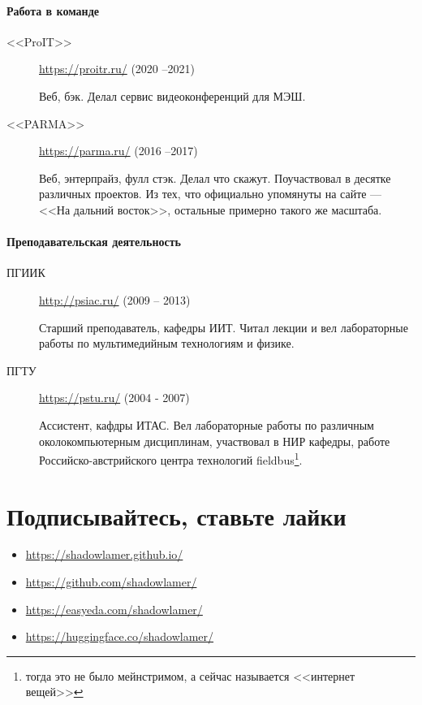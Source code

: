 \documentclass [a4paper,10pt]{article}
\begin{document}
\paragraph{Работа в команде}
\begin{description}
\item[<<ProIT>>] \url{https://proitr.ru/} (2020 --2021)

Веб, бэк. Делал сервис видеоконференций для МЭШ.

\item[<<PARMA>>] \url{https://parma.ru/} (2016 --2017)

Веб, энтерпрайз, фулл стэк. Делал что скажут. Поучаствовал в десятке различных проектов.
Из тех, что официально упомянуты на сайте --- <<На дальний восток>>, остальные примерно такого же масштаба.
\end{description}

\paragraph{Преподавательская деятельность}
\begin{description}
\item[ПГИИК] \url{http://psiac.ru/} (2009 -- 2013)

Старший преподаватель, кафедры ИИТ. Читал лекции и вел лабораторные работы по мультимедийным технологиям и физике.

\item[ПГТУ] \url{https://pstu.ru/} (2004 - 2007)

Ассистент, кафдры ИТАС. Вел лабораторные работы по различным околокомпьютерным дисциплинам,
участвовал в НИР кафедры, работе Российско-австрийского центра технологий fieldbus\footnote{тогда это не было мейнстримом, а сейчас называется <<интернет вещей>>}.
\end{description}

\section*{Подписывайтесь, ставьте лайки}
\begin{itemize}
\item\url{https://shadowlamer.github.io/}
\item\url{https://github.com/shadowlamer/}
\item\url{https://easyeda.com/shadowlamer/}
\item\url{https://huggingface.co/shadowlamer/}
\end{itemize}
\end{document}
